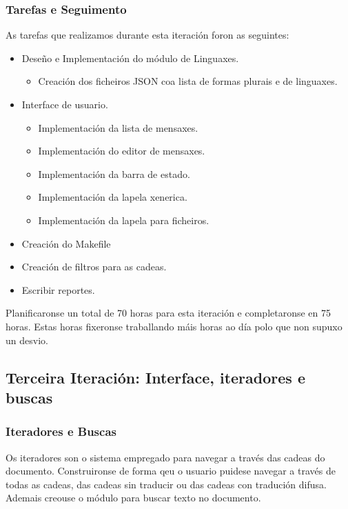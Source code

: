 \subsubsection{Tarefas e Seguimento}

As tarefas que realizamos durante esta iteración foron as seguintes:

\begin{itemize}
  \item Deseño e Implementación do módulo de Linguaxes.
    \begin{itemize}
      \item Creación dos ficheiros JSON coa lista de formas plurais e de linguaxes.
    \end{itemize}
  \item Interface de usuario.
    \begin{itemize}
      \item Implementación da lista de mensaxes.
      \item Implementación do editor de mensaxes.
      \item Implementación da barra de estado.
      \item Implementación da lapela xenerica.
      \item Implementación da lapela para ficheiros.
    \end{itemize}
  \item Creación do Makefile
  \item Creación de filtros para as cadeas.
  \item Escribir reportes.
\end{itemize}

Planificaronse un total de 70 horas para esta iteración e completaronse en 75 horas. Estas horas fixeronse traballando máis horas ao día polo que non supuxo un desvio. 

\subsection{Terceira Iteración: Interface, iteradores e buscas}

\subsubsection{Iteradores e Buscas}
Os iteradores son o sistema empregado para navegar a través das cadeas do documento. Construironse de forma qeu o usuario puidese navegar a través de todas as cadeas, das cadeas sin traducir ou das cadeas con tradución difusa. Ademais creouse o módulo para buscar texto no documento.

